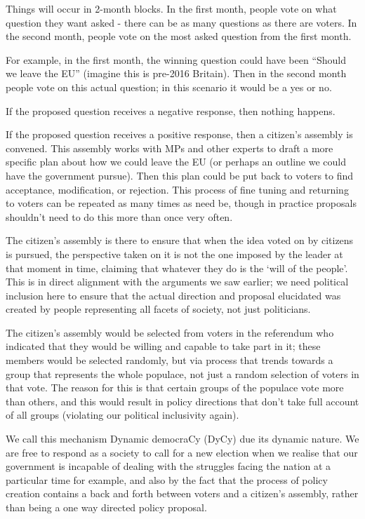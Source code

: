 \documentclass[twoside]{article}
\theoremstyle{definition}
\begin{document}
Things will occur in 2-month blocks. In the first month, people vote on what question they want asked - there can be as many questions as there are voters. In the second month, people vote on the most asked question from the first month.

For example, in the first month, the winning question could have been “Should we leave the EU” (imagine this is pre-2016 Britain). Then in the second month people vote on this actual question; in this scenario it would be a yes or no.

If the proposed question receives a negative response, then nothing happens.

If the proposed question receives a positive response, then a citizen’s assembly is convened. This assembly works with MPs and other experts to draft a more specific plan about how we could leave the EU (or perhaps an outline we could have the government pursue). Then this plan could be put back to voters to find acceptance, modification, or rejection. This process of fine tuning and returning to voters can be repeated as many times as need be, though in practice proposals shouldn’t need to do this more than once very often.

The citizen’s assembly is there to ensure that when the idea voted on by citizens is pursued, the perspective taken on it is not the one imposed by the leader at that moment in time, claiming that whatever they do is the ‘will of the people’. This is in direct alignment with the arguments we saw earlier; we need political inclusion here to ensure that the actual direction and proposal elucidated was created by people representing all facets of society, not just politicians.

The citizen’s assembly would be selected from voters in the referendum who indicated that they would be willing and capable to take part in it; these members would be selected randomly, but via process that trends towards a group that represents the whole populace, not just a random selection of voters in that vote. The reason for this is that certain groups of the populace vote more than others, and this would result in policy directions that don’t take full account of all groups (violating our political inclusivity again).

We call this mechanism Dynamic democraCy (DyCy) due its dynamic nature. We are free to respond as a society to call for a new election when we realise that our government is incapable of dealing with the struggles facing the nation at a particular time for example, and also by the fact that the process of policy creation contains a back and forth between voters and a citizen’s assembly, rather than being a one way directed policy proposal.
\end{document}
